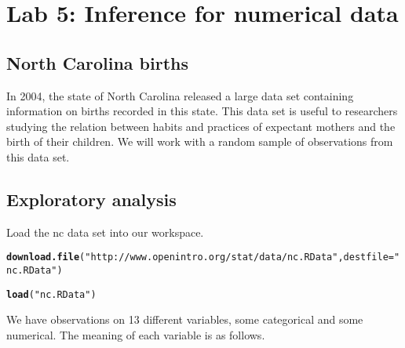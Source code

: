 \documentclass{article}\usepackage[]{graphicx}\usepackage[]{color}
\makeatletter
\newcommand{\hlstr}[1]{\textcolor[rgb]{0.192,0.494,0.8}{#1}}%
\newcommand{\hlstd}[1]{\textcolor[rgb]{0.345,0.345,0.345}{#1}}%
\newcommand{\hlkwc}[1]{\textcolor[rgb]{0.333,0.667,0.333}{#1}}%
\newcommand{\hlkwd}[1]{\textcolor[rgb]{0.737,0.353,0.396}{\textbf{#1}}}%
\newenvironment{kframe}{%
 \def\at@end@of@kframe{}%
 \ifinner\ifhmode%
  \def\at@end@of@kframe{\end{minipage}}%
  \begin{minipage}{\columnwidth}%
 \fi\fi%
 \def\FrameCommand##1{\hskip\@totalleftmargin \hskip-\fboxsep
 \colorbox{shadecolor}{##1}\hskip-\fboxsep
     \hskip-\linewidth \hskip-\@totalleftmargin \hskip\columnwidth}%
 \MakeFramed {\advance\hsize-\width
   \@totalleftmargin\z@ \linewidth\hsize
   \@setminipage}}%
 {\par\unskip\endMakeFramed%
 \at@end@of@kframe}
\newenvironment{knitrout}{}{} %
\makeatother
\begin{document}

\section*{Lab 5: Inference for numerical data}

\subsection*{North Carolina births}

In 2004, the state of North Carolina released a large data set containing information on births recorded in this state. This data set is useful to researchers studying the relation between habits and practices of expectant mothers and the birth of their children. We will work with a random sample of observations from this data set.

\subsection*{Exploratory analysis}
Load the \hlstd{nc} data set into our workspace.

\begin{knitrout}
\color{fgcolor}\begin{kframe}
\begin{alltt}
\hlkwd{download.file}\hlstd{(}\hlstr{"http://www.openintro.org/stat/data/nc.RData"}\hlstd{,} \hlkwc{destfile} \hlstd{=} \hlstr{"nc.RData"}\hlstd{)}

\hlkwd{load}\hlstd{(}\hlstr{"nc.RData"}\hlstd{)}
\end{alltt}
\end{kframe}
\end{knitrout}


We have observations on 13 different variables, some categorical and some numerical. The meaning of each variable is as follows.
\end{document}
